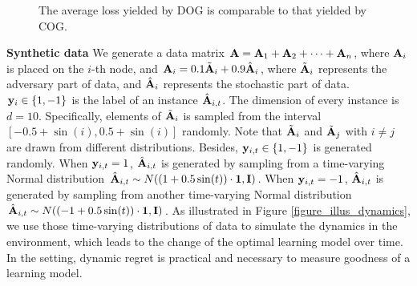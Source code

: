 \documentclass{article}
\begin{document}
\begin{figure}[!h]
\caption{The average loss yielded by DOG is comparable to that yielded by COG.}
\label{figure_compare_loss}
\end{figure}







\textbf{Synthetic data} We generate a data matrix ${\bf A}={\bf A}_1 + {\bf A}_2+ \cdots + {\bf A}_n$, where ${\bf A}_i$ is placed on the $i$-th node, and ${\bf A}_i=0.1\tilde{{\bf A}}_i+0.9\hat{{\bf A}}_i$, where $\tilde{{\bf A}}_i$ represents the adversary part of data, and $\hat{{\bf A}}_i$ represents the stochastic part of data. ${\bf y}_{i}\in\{1,-1\}$ is the label of an instance $\hat{{\bf A}}_{i,t}$. The dimension of every instance is $d = 10$. Specifically,  elements of $\tilde{{\bf A}}_i$ is sampled from the interval $[-0.5+\sin(i),0.5+\sin(i)]$ randomly. Note that $\tilde{{\bf A}}_i$ and $\tilde{{\bf A}}_j$ with $i\neq j$ are drawn from different distributions. Besides, ${\bf y}_{i,t}\in\{1,-1\}$ is generated randomly. When ${\bf y}_{i,t}=1$, $\hat{{\bf A}}_{i,t}$ is generated by sampling from a time-varying Normal distribution $\hat{{\bf A}}_{i,t} \sim N((1+0.5\sin(t))\cdot{\bf 1}, {\bf I})$. When ${\bf y}_{i,t} = -1$, $\hat{{\bf A}}_{i,t}$ is generated by sampling from another time-varying Normal distribution $\hat{{\bf A}}_{i,t} \sim N((-1+0.5\sin(t))\cdot{\bf 1}, {\bf I})$. As illustrated in Figure \ref{figure_illus_dynamics}, we use those time-varying distributions of data to simulate the dynamics in the environment, which leads to the change of the optimal learning model over time.  In the setting, dynamic regret is practical and necessary to measure goodness of a learning model. 
\end{document}

